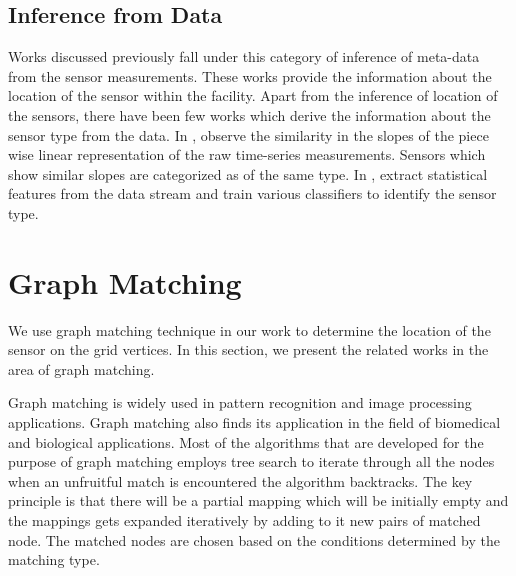 \subsection{Inference from Data}
Works \cite{Hong:2013:TAS:2528282.2528302,doi:10.1061/9780784413616.226,Koc:2014:CLC:2674061.2674075,Lu:2014:SBS:2648771.2629441,ellis2012creating,muller2014automated,marinakis2005learning} discussed previously fall under this category of inference of meta-data from the sensor measurements. These works provide the information about the location of the sensor within the facility. 
Apart from the inference of location of the sensors, there have been few works which derive the information about the sensor type from the data. In \cite{calbimonte2012deriving}, \citeauthor{calbimonte2012deriving} observe the similarity in the slopes of the piece wise linear representation of the raw time-series measurements. Sensors which show similar slopes are categorized as of the same type. In \cite{gao2015data}, \citeauthor{gao2015data} extract statistical features from the data stream and train various classifiers to identify the sensor type.

\section{Graph Matching}
\label{sec:graphLitReview}
We use graph matching technique in our work to determine the location of the sensor on the grid vertices. In this section, we present the related works in the area of graph matching.

Graph matching is widely used in pattern recognition and image processing applications. Graph matching also finds its application in the field of biomedical and biological applications. 
Most of the algorithms that are developed for the purpose of graph matching employs tree search to iterate through all the nodes when an unfruitful match is encountered the algorithm backtracks.
The key principle is that there will be a partial mapping which will be initially empty and the mappings gets expanded iteratively by adding to it new pairs of matched node. The matched nodes are chosen based on the conditions determined by the matching type.

